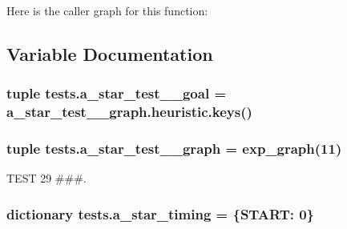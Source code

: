 Here is the caller graph for this function\+:




\subsection{Variable Documentation}
\hypertarget{namespacetests_a6d49f405fd47e910efb683f0edb3ccdd}{}
\subsubsection[{a\+\_\+star\+\_\+test\+\_\+5\+\_\+goal}]{\setlength{\rightskip}{0pt plus 5cm}tuple tests.\+a\+\_\+star\+\_\+test\+\_\+\_\+goal = a\+\_\+star\+\_\+test\+\_\+\_\+graph.\+heuristic.\+keys()}\label{namespacetests_a6d49f405fd47e910efb683f0edb3ccdd}
\hypertarget{namespacetests_adb23c2f6b77c48139361b834568757a9}{}
\subsubsection[{a\+\_\+star\+\_\+test\+\_\+5\+\_\+graph}]{\setlength{\rightskip}{0pt plus 5cm}tuple tests.\+a\+\_\+star\+\_\+test\+\_\+\_\+graph = {\bf exp\+\_\+graph}(11)}\label{namespacetests_adb23c2f6b77c48139361b834568757a9}


T\+E\+S\+T 29 \#\#\#. 

\hypertarget{namespacetests_a3ca3bcdf053d21e7e9248b6f3e68138f}{}
\subsubsection[{a\+\_\+star\+\_\+timing}]{\setlength{\rightskip}{0pt plus 5cm}dictionary tests.\+a\+\_\+star\+\_\+timing = \{\textquotesingle{}S\+T\+A\+R\+T\textquotesingle{}\+: 0\}}\label{namespacetests_a3ca3bcdf053d21e7e9248b6f3e68138f}
\hypertarget{namespacetests_a10c32ad045f7c3fbe53ea5c04b2efe80}{}
